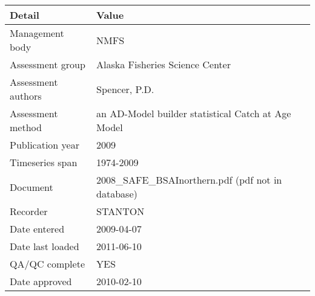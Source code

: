\begin{table}[htb]
\centering
\begin{tabular}{lp{7cm}}
\toprule
Detail & Value \\
\midrule
Management body    & NMFS                                               \\
Assessment group   & Alaska Fisheries Science Center                    \\
Assessment authors & Spencer, P.D.                                      \\
Assessment method  & an AD-Model builder statistical Catch at Age Model \\
Publication year   & 2009                                               \\
Timeseries span    & 1974-2009                                          \\
Document           & 2008\_SAFE\_BSAInorthern.pdf (pdf not in database) \\
Recorder           & STANTON                                            \\
Date entered       & 2009-04-07                                         \\
Date last loaded   & 2011-06-10                                         \\
QA/QC complete     & YES                                                \\
Date approved      & 2010-02-10                                         \\
\bottomrule
\end{tabular}
\label{tab:assessdet}
\end{table}
